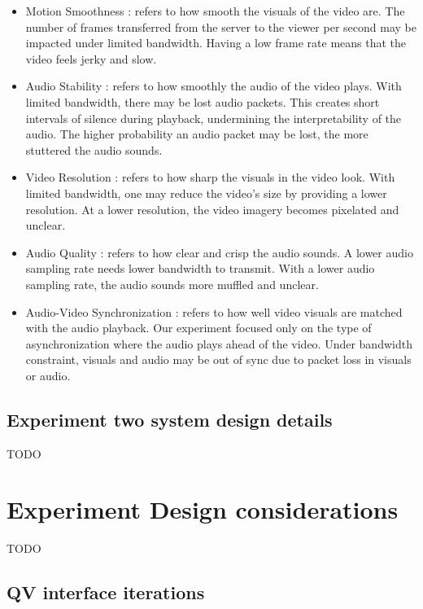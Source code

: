 \begin{itemize}
    \item Motion Smoothness \cite{huynh2008temporal, oeldorf2012bad}: refers to how smooth the visuals of the video are. The number of frames transferred from the server to the viewer per second may be impacted under limited bandwidth. Having a low frame rate means that the video feels jerky and slow.
    \item Audio Stability \cite{hardman1998successful}: refers to how smoothly the audio of the video plays. With limited bandwidth, there may be lost audio packets. This creates short intervals of silence during playback, undermining the interpretability of the audio. The higher probability an audio packet may be lost, the more stuttered the audio sounds.
    \item Video Resolution \cite{oeldorf2012bad, knoche2005can}: refers to how sharp the visuals in the video look. With limited bandwidth, one may reduce the video's size by providing a lower resolution. At a lower resolution, the video imagery becomes pixelated and unclear. 
    \item Audio Quality \cite{oeldorf2012bad, noll1993wideband}: refers to how clear and crisp the audio sounds. A lower audio sampling rate needs lower bandwidth to transmit. With a lower audio sampling rate, the audio sounds more muffled and unclear.
    \item Audio-Video Synchronization \cite{steinmetz1996human}: refers to how well video visuals are matched with the audio playback. Our experiment focused only on the type of asynchronization where the audio plays ahead of the video. Under bandwidth constraint, visuals and audio may be out of sync due to packet loss in visuals or audio.
\end{itemize}

\subsection{Experiment two system design details}
TODO

\section{Experiment Design considerations}
TODO


\subsection{QV interface iterations}


